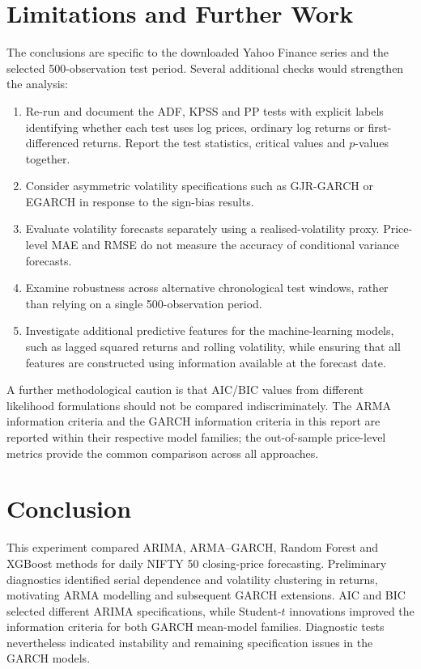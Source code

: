 \documentclass[10pt,a4paper]{article}
\begin{document}
\section{Limitations and Further Work}

The conclusions are specific to the downloaded Yahoo Finance series and the selected 500-observation test period. Several additional checks would strengthen the analysis:
\begin{enumerate}[leftmargin=2em]
  \item Re-run and document the ADF, KPSS and PP tests with explicit labels identifying whether each test uses log prices, ordinary log returns or first-differenced returns. Report the test statistics, critical values and $p$-values together.
  \item Consider asymmetric volatility specifications such as GJR-GARCH or EGARCH in response to the sign-bias results.
  \item Evaluate volatility forecasts separately using a realised-volatility proxy. Price-level MAE and RMSE do not measure the accuracy of conditional variance forecasts.
  \item Examine robustness across alternative chronological test windows, rather than relying on a single 500-observation period.
  \item Investigate additional predictive features for the machine-learning models, such as lagged squared returns and rolling volatility, while ensuring that all features are constructed using information available at the forecast date.
\end{enumerate}

A further methodological caution is that AIC/BIC values from different likelihood formulations should not be compared indiscriminately. The ARMA information criteria and the GARCH information criteria in this report are reported within their respective model families; the out-of-sample price-level metrics provide the common comparison across all approaches.

\section{Conclusion}

This experiment compared ARIMA, ARMA--GARCH, Random Forest and XGBoost methods for daily NIFTY 50 closing-price forecasting. Preliminary diagnostics identified serial dependence and volatility clustering in returns, motivating ARMA modelling and subsequent GARCH extensions. AIC and BIC selected different ARIMA specifications, while Student-$t$ innovations improved the information criteria for both GARCH mean-model families. Diagnostic tests nevertheless indicated instability and remaining specification issues in the GARCH models.
\end{document}
